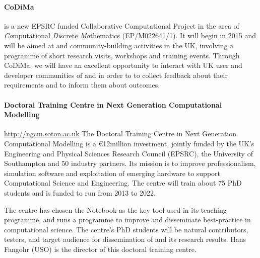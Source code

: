 \paragraph{CoDiMa} is a new EPSRC funded Collaborative Computational Project
in the area of {\em Co}mputational {\em Di}screte {\em Ma}thematics (EP/M022641/1).
It will begin in 2015 and will be aimed at \GAP and \Sage community-building
activities in the UK, involving a programme of short research visits, workshops
and training events. Through CoDiMa, we will have an excellent opportunity to
interact with UK user and developer communities of \GAP and \Sage in order to
to collect feedback about their requirements and to inform them about \TheProject
outcomes.

\paragraph{Doctoral Training Centre in Next Generation Computational Modelling}
\url{http://ngcm.soton.ac.uk} The Doctoral Training Centre in Next
Generation Computational Modelling is a \euro{12}million investment,
jointly funded by the UK's Engineering and Physical Sciences Research
Council (EPSRC), the University of Southampton and 50 industry
partners. Its mission is to improve professionalism, simulation
software and exploitation of emerging hardware to support
Computational Science and Engineering. The centre will train about 75
PhD students and is funded to run from 2013 to 2022.

The centre has chosen the \Jupyter Notebook as the key tool used in
its teaching programme, and runs a programme to improve and
disseminate best-practice in computational science. The centre's PhD
students will be natural contributors, testers, and target audience
for dissemination of \TheProject and its research results. Hans
Fangohr (USO) is the director of this doctoral training centre.



